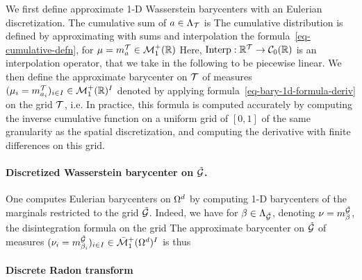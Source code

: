 We first define approximate 1-D Wasserstein barycenters with an Eulerian discretization. The cumulative sum of $a \in \Lambda_{\mathcal{T}}$ is 
The cumulative distribution is defined by approximating with sums and interpolation the formula~\eqref{eq-cumulative-defn}, for $\mu = {m_{a}^{\mathcal{T}}} \in \mathcal{M}_1^+(\mathbb{R})$ 
Here, $\text{Interp} : \mathbb{R}^{\mathcal{T}} \rightarrow \mathcal{C}_0(\mathbb{R})$ is an interpolation operator, that we take in the following to be piecewise linear.
We then define the approximate barycenter on $\mathcal{T}$ of measures $( \mu_i = {m_{a_i}^{\mathcal{T}}} )_{i \in I} \in \mathcal{M}_1^+(\mathbb{R})^I$ denoted
by applying formula~\eqref{eq-bary-1d-formula-deriv} on the grid $\mathcal{T}$, i.e.
In practice, this formula is computed accurately by computing the inverse cumulative function on a uniform grid of $[0,1]$ of the same granularity as the spatial discretization, and computing the derivative with finite differences on this grid. 

\paragraph{Discretized Wasserstein barycenter on $\tilde{\mathcal{G}}$. }

One computes Eulerian barycenters on $\Omega^d$ by computing 1-D barycenters of the marginals restricted to the grid $\tilde{\mathcal{G}}$. Indeed, we have for $\beta \in \Lambda_{{\tilde {\mathcal{G}}}}$, denoting $\nu = {m_{\beta}^{{\tilde {\mathcal{G}}}}}$, the disintegration formula on the grid
The approximate barycenter on ${\tilde {\mathcal{G}}}$ of measures $( \nu_i = {m_{\beta_i}^{{\tilde {\mathcal{G}}}}} )_{i \in I} \in \bar{\mathcal{M}}_1^+(\Omega^d)^I$ is thus

\paragraph{Discrete Radon transform}

